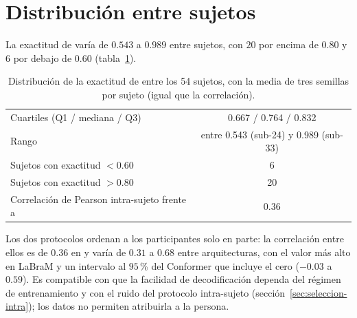 \section{Distribución entre sujetos}

La exactitud \loso{} de \eegnet{} varía de $0.543$ a $0.989$ entre sujetos, con $20$ por encima de
$0.80$ y $6$ por debajo de $0.60$ (tabla~\ref{tab:distribucion}).

\begin{table}[H]
\centering
\caption{Distribución de la exactitud \loso{} de \eegnet{} entre los 54 sujetos, con la media de tres semillas por sujeto (igual que la correlación).}
\label{tab:distribucion}
\begin{tabular}{p{7.5cm}c}
\toprule
Cuartiles (Q1 / mediana / Q3) & 0.667 / 0.764 / 0.832 \\
Rango & entre 0.543 (sub-24) y 0.989 (sub-33) \\
Sujetos con exactitud $< 0.60$ & 6 \\
Sujetos con exactitud $> 0.80$ & 20 \\
Correlación de Pearson intra-sujeto frente a \loso{} & 0.36 \\
\bottomrule
\end{tabular}
\end{table}

Los dos protocolos ordenan a los participantes solo en parte: la correlación entre ellos es de
$0.36$ en \eegnet{} y varía de $0.31$ a $0.68$ entre arquitecturas, con el valor más alto en LaBraM y
un intervalo al $95$\,\% del Conformer que incluye el cero ($-0.03$ a $0.59$). Es compatible con que la
facilidad de decodificación dependa del régimen de entrenamiento y con el ruido del protocolo
intra-sujeto (sección~\ref{sec:seleccion-intra}); los datos no permiten atribuirla a la persona.

